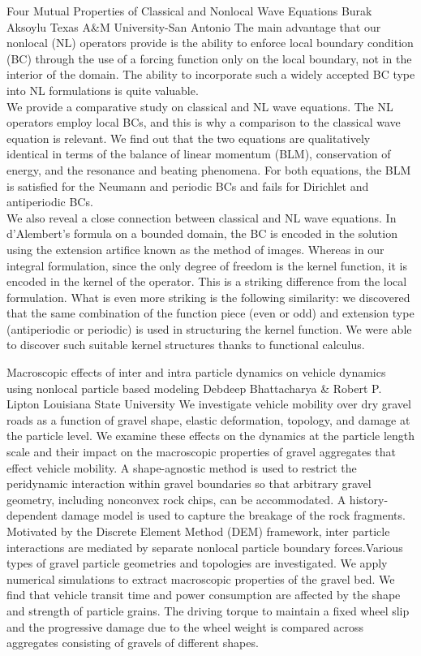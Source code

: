 \begin{addmargin}[2em]{0em}
\vspace{2ex}
\abs
{Four Mutual Properties of Classical and Nonlocal Wave Equations}
{Burak Aksoylu}
{Texas A\&M University-San Antonio}
{The main advantage that our nonlocal (NL) operators provide is the ability to enforce local boundary condition (BC) through the use of a forcing function only on the local boundary, not in the interior of the domain.  The ability to incorporate such a widely accepted BC type into NL formulations is quite valuable.\\
We provide a comparative study on classical and NL wave equations.  The NL operators employ local BCs, and this is why a comparison to the classical wave equation is relevant. We find out that the two equations are qualitatively identical in terms of the balance of linear momentum (BLM), conservation of energy, and the resonance and beating phenomena. For both equations, the BLM is satisfied for the Neumann and periodic BCs and fails for Dirichlet and antiperiodic BCs.\\
We also reveal a close connection between classical and NL wave equations.  In d’Alembert’s formula on a bounded domain, the BC is encoded in the solution using the extension artifice known as the method of images. Whereas in our integral formulation, since the only degree of freedom is the kernel function, it is encoded in the kernel of the operator. This is a striking difference from the local formulation. What is even more striking is the following similarity: we discovered that the same combination of the function piece (even or odd) and extension type (antiperiodic or periodic) is used in structuring the kernel function.  We were able to discover such suitable kernel structures thanks to functional calculus.}


\vspace{1.5ex}
\abs
{Macroscopic effects of inter and intra particle dynamics on vehicle dynamics using nonlocal particle based modeling}
{Debdeep Bhattacharya \& Robert P. Lipton}
{Louisiana State University}
{We investigate vehicle mobility over dry gravel roads as a function of gravel shape, elastic deformation, topology, and damage at the particle level. We examine these effects on the dynamics at the particle length scale and their impact on the macroscopic properties of gravel aggregates that effect vehicle mobility. A shape-agnostic method is used to restrict the peridynamic interaction within gravel boundaries so that arbitrary gravel geometry, including nonconvex rock chips, can be accommodated.  A history-dependent damage model is used to capture the breakage of the rock fragments. Motivated by the Discrete Element Method (DEM) framework, inter particle interactions are mediated by separate nonlocal particle boundary forces.Various types of gravel particle geometries and topologies are investigated. We apply numerical simulations to extract macroscopic properties of the gravel bed. We find that vehicle transit time and power consumption are affected by the shape and strength of particle grains.  The driving torque to maintain a fixed wheel slip and the progressive damage due to the wheel weight is compared across aggregates consisting of gravels of different shapes.}



\end{addmargin}
